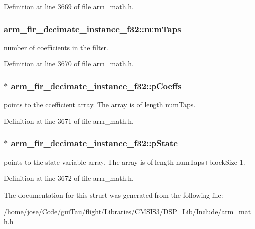 Definition at line 3669 of file arm\-\_\-math.\-h.

\hypertarget{structarm__fir__decimate__instance__f32_a2aa2986129db8affef03ede88dd45a03}{
\subsubsection[{num\-Taps}]{ arm\-\_\-fir\-\_\-decimate\-\_\-instance\-\_\-f32\-::num\-Taps}}\label{structarm__fir__decimate__instance__f32_a2aa2986129db8affef03ede88dd45a03}
number of coefficients in the filter. 

Definition at line 3670 of file arm\-\_\-math.\-h.

\hypertarget{structarm__fir__decimate__instance__f32_a268a8b0e80a3d9764baf33e4bc10dde2}{
\subsubsection[{p\-Coeffs}]{$\ast$ arm\-\_\-fir\-\_\-decimate\-\_\-instance\-\_\-f32\-::p\-Coeffs}}\label{structarm__fir__decimate__instance__f32_a268a8b0e80a3d9764baf33e4bc10dde2}
points to the coefficient array. The array is of length num\-Taps. 

Definition at line 3671 of file arm\-\_\-math.\-h.

\hypertarget{structarm__fir__decimate__instance__f32_a5bddf29aaaf2011d2e3bcec59a83f633}{
\subsubsection[{p\-State}]{$\ast$ arm\-\_\-fir\-\_\-decimate\-\_\-instance\-\_\-f32\-::p\-State}}\label{structarm__fir__decimate__instance__f32_a5bddf29aaaf2011d2e3bcec59a83f633}
points to the state variable array. The array is of length num\-Taps+block\-Size-\/1. 

Definition at line 3672 of file arm\-\_\-math.\-h.



The documentation for this struct was generated from the following file\-:\begin{DoxyCompactItemize}
\item 
/home/jose/\-Code/gui\-Tau/flight/\-Libraries/\-C\-M\-S\-I\-S3/\-D\-S\-P\-\_\-\-Lib/\-Include/\hyperlink{arm__math_8h}{arm\-\_\-math.\-h}\end{DoxyCompactItemize}
